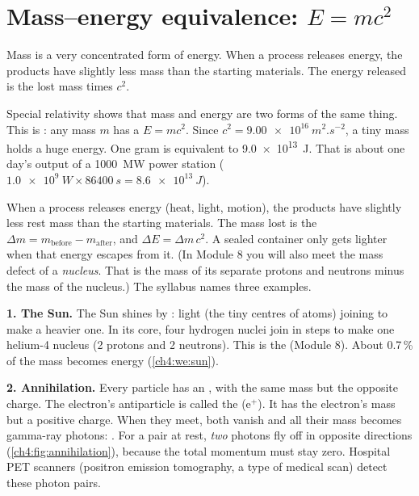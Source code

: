 \section{Mass--energy equivalence: \texorpdfstring{$E = mc^2$}{E = mc2}}\label{ch4:sec:emc2}

\begin{bigidea}
Mass is a very concentrated form of energy. When a process releases energy, the products have
slightly less mass than the starting materials. The energy released is the lost mass times $c^2$.
\end{bigidea}

\begin{keywords}
\end{keywords}

Special relativity shows that mass and energy are two forms of the same thing. This is
: any mass $m$ has a  $E = mc^2$. Since
$c^2 = \qty{9.00e16}{m^2.s^{-2}}$, a tiny mass holds a huge energy. One gram is equivalent to
\qty{9.0e13}{J}. That is about one day's output of a \qty{1000}{MW} power station
($\qty{1.0e9}{W} \times \qty{86400}{s} = \qty{8.6e13}{J}$).

When a process releases energy (heat, light, motion), the products have slightly less rest mass
than the starting materials. The mass lost is the 
$\Delta m = m_\mathrm{before} - m_\mathrm{after}$, and $\Delta E = \Delta m\,c^2$. A sealed
container only gets lighter when that energy escapes from it. (In Module 8 you will also meet the
mass defect of a \emph{nucleus}. That is the mass of its separate protons and neutrons minus the
mass of the nucleus.) The syllabus names three examples.

\textbf{1. The Sun.} The Sun shines by : light  (the tiny
centres of atoms) joining to make a heavier one. In its core, four hydrogen nuclei join in steps
to make one helium-4 nucleus (2 protons and 2 neutrons). This is the  (Module 8). About 0.7\,\% of the mass becomes energy (\cref{ch4:we:sun}).

\textbf{2. Annihilation.} Every particle has an , with the same mass but
the opposite charge. The electron's antiparticle is called the  ($\mathrm{e}^+$).
It has the electron's mass but a positive charge. When they meet, both vanish and all their mass
becomes gamma-ray photons: . For a pair at rest, \emph{two} photons fly off in
opposite directions (\cref{ch4:fig:annihilation}), because the total momentum must stay zero.
Hospital PET scanners (positron emission tomography, a type of medical scan) detect these photon
pairs.

